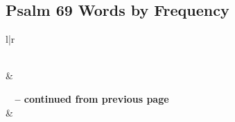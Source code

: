 

\subsection{Psalm 69 Words by Frequency}


\normalsize
 
\begin{center}
\begin{longtable}{l|r}
\caption[Psalm 69 Words by Frequency]{Psalm 69 Words by Frequency}\label{table:WordsbyFrequency for Psalm 69} \\
\hline {} &  \\ \hline 
\endfirsthead
 
{{\bfseries \tablename\ \thetable{} -- continued from previous page}} \\  
\hline {} &  \\ \hline 
\endhead
 

\end{longtable}
\end{center}
